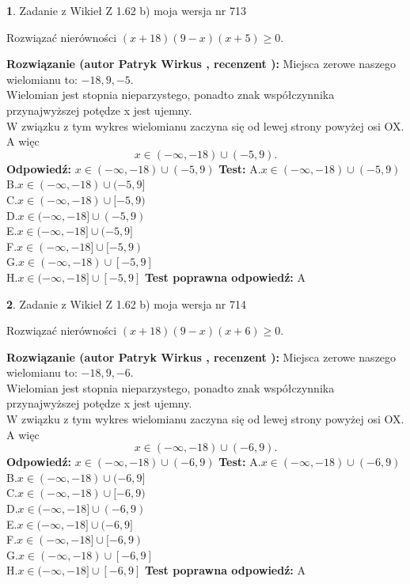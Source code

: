 \documentclass[12pt, a4paper]{article}
\theoremstyle{definition} %
\newtheorem{zad}{}
\newcommand{\zadStart}[1]{\begin{zad}#1\newline}
\newcommand{\zadStop}{\end{zad}}
\newcommand{\rozwStart}[2]{\noindent \textbf{Rozwiązanie (autor #1 , recenzent #2): }\newline}
\newcommand{\rozwStop}{\newline}
\newcommand{\odpStart}{\noindent \textbf{Odpowiedź:}\newline}
\newcommand{\odpStop}{\newline}
\newcommand{\testStart}{\noindent \textbf{Test:}\newline}
\newcommand{\testStop}{\newline}
\newcommand{\kluczStart}{\noindent \textbf{Test poprawna odpowiedź:}\newline}
\newcommand{\kluczStop}{\newline}
\begin{document}
\zadStart{Zadanie z Wikieł Z 1.62 b) moja wersja nr 713}

Rozwiązać nierówności $(x+18)(9-x)(x+5)\ge0$.
\zadStop
\rozwStart{Patryk Wirkus}{}
Miejsca zerowe naszego wielomianu to: $-18, 9, -5$.\\
Wielomian jest stopnia nieparzystego, ponadto znak współczynnika przy\linebreak najwyższej potędze x jest ujemny.\\ W związku z tym wykres wielomianu zaczyna się od lewej strony powyżej osi OX. A więc $$x \in (-\infty,-18) \cup (-5,9).$$
\rozwStop
\odpStart
$x \in (-\infty,-18) \cup (-5,9)$
\odpStop
\testStart
A.$x \in (-\infty,-18) \cup (-5,9)$\\
B.$x \in (-\infty,-18) \cup (-5,9]$\\
C.$x \in (-\infty,-18) \cup [-5,9)$\\
D.$x \in (-\infty,-18] \cup (-5,9)$\\
E.$x \in (-\infty,-18] \cup (-5,9]$\\
F.$x \in (-\infty,-18] \cup [-5,9)$\\
G.$x \in (-\infty,-18) \cup [-5,9]$\\
H.$x \in (-\infty,-18] \cup [-5,9]$
\testStop
\kluczStart
A
\kluczStop



\zadStart{Zadanie z Wikieł Z 1.62 b) moja wersja nr 714}

Rozwiązać nierówności $(x+18)(9-x)(x+6)\ge0$.
\zadStop
\rozwStart{Patryk Wirkus}{}
Miejsca zerowe naszego wielomianu to: $-18, 9, -6$.\\
Wielomian jest stopnia nieparzystego, ponadto znak współczynnika przy\linebreak najwyższej potędze x jest ujemny.\\ W związku z tym wykres wielomianu zaczyna się od lewej strony powyżej osi OX. A więc $$x \in (-\infty,-18) \cup (-6,9).$$
\rozwStop
\odpStart
$x \in (-\infty,-18) \cup (-6,9)$
\odpStop
\testStart
A.$x \in (-\infty,-18) \cup (-6,9)$\\
B.$x \in (-\infty,-18) \cup (-6,9]$\\
C.$x \in (-\infty,-18) \cup [-6,9)$\\
D.$x \in (-\infty,-18] \cup (-6,9)$\\
E.$x \in (-\infty,-18] \cup (-6,9]$\\
F.$x \in (-\infty,-18] \cup [-6,9)$\\
G.$x \in (-\infty,-18) \cup [-6,9]$\\
H.$x \in (-\infty,-18] \cup [-6,9]$
\testStop
\kluczStart
A
\kluczStop
\end{document}
